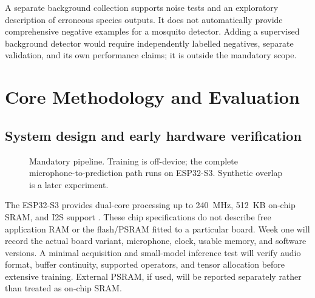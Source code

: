 \documentclass[a4paper,11pt]{article}
\begin{document}
A separate background collection supports noise tests and an exploratory description of erroneous species outputs. It does not automatically provide comprehensive negative examples for a mosquito detector. Adding a supervised background detector would require independently labelled negatives, separate validation, and its own performance claims; it is outside the mandatory scope.

\section{Core Methodology and Evaluation}
\subsection{System design and early hardware verification}
\begin{figure}[htbp]
\centering
{}
\caption{Mandatory pipeline. Training is off-device; the complete microphone-to-prediction path runs on ESP32-S3. Synthetic overlap is a later experiment.}
\label{fig:pipeline}
\end{figure}

The ESP32-S3 provides dual-core processing up to 240~MHz, 512~KB on-chip SRAM, and I2S support \cite{espdatasheet}. These chip specifications do not describe free application RAM or the flash/PSRAM fitted to a particular board. Week one will record the actual board variant, microphone, clock, usable memory, and software versions. A minimal acquisition and small-model inference test will verify audio format, buffer continuity, supported operators, and tensor allocation before extensive training. External PSRAM, if used, will be reported separately rather than treated as on-chip SRAM.
\end{document}
